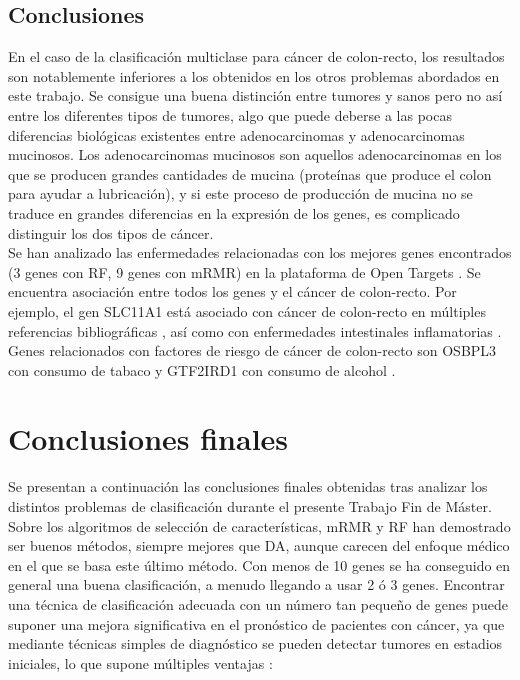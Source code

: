 \subsection{Conclusiones}

En el caso de la clasificación multiclase para cáncer de colon-recto, los resultados son notablemente inferiores a los obtenidos en los otros problemas abordados en este trabajo. Se consigue una buena distinción entre tumores y sanos pero no así entre los diferentes tipos de tumores, algo que puede deberse a las pocas diferencias biológicas existentes entre adenocarcinomas y adenocarcinomas mucinosos. Los adenocarcinomas mucinosos son aquellos adenocarcinomas en los que se producen grandes cantidades de mucina (proteínas que produce el colon para ayudar a lubricación), y si este proceso de producción de mucina no se traduce en grandes diferencias en la expresión de los genes, es complicado distinguir los dos tipos de cáncer. \\

Se han analizado las enfermedades relacionadas con los mejores genes encontrados (3 genes con RF, 9 genes con mRMR) en la plataforma de Open Targets \cite{OpenTargets2020}. Se encuentra asociación entre todos los genes y el cáncer de colon-recto. Por ejemplo, el gen SLC11A1 está asociado con cáncer de colon-recto en múltiples referencias bibliográficas \cite{Law2019, Tanskanen2018, Huyghe2019}, así como con enfermedades intestinales inflamatorias \cite{Jostins2012, DeLange2017}. Genes relacionados con factores de riesgo de cáncer de colon-recto son OSBPL3 con consumo de tabaco \cite{Liu2019} y GTF2IRD1 con consumo de alcohol \cite{biobank}.

\section{Conclusiones finales}

Se presentan a continuación las conclusiones finales obtenidas tras analizar los distintos problemas de clasificación durante el presente Trabajo Fin de Máster.\\

Sobre los algoritmos de selección de características, mRMR y RF han demostrado ser buenos métodos, siempre mejores que DA, aunque carecen del enfoque médico en el que se basa este último método. Con menos de 10 genes se ha conseguido en general una buena clasificación, a menudo llegando a usar 2 ó 3 genes. Encontrar una técnica de clasificación adecuada con un número tan pequeño de genes puede suponer una mejora significativa en el pronóstico de pacientes con cáncer, ya que mediante técnicas simples de diagnóstico se pueden detectar tumores en estadios iniciales, lo que supone múltiples ventajas \cite{Whitaker2020}:


